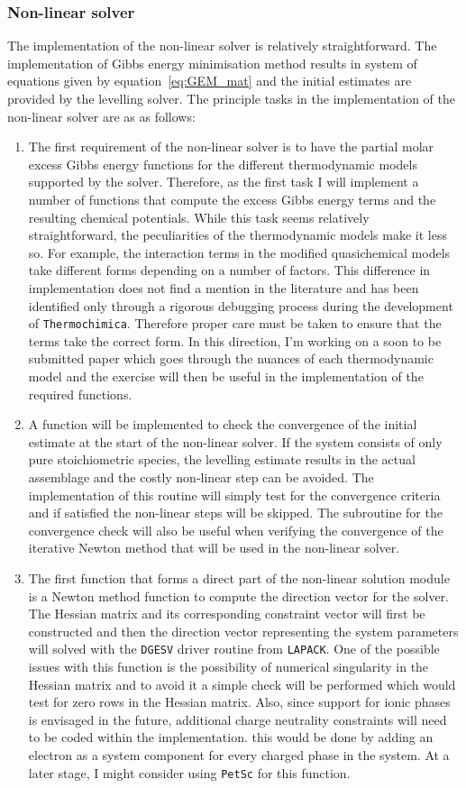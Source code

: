 	\subsubsection{Non-linear solver}
		The implementation of the non-linear solver is relatively straightforward. The implementation of Gibbs energy minimisation method results in system of equations given by equation~\eqref{eq:GEM_mat} and the initial estimates are provided by the levelling solver. The principle tasks in the implementation of the non-linear solver are as as follows:
		\begin{enumerate}
			\item The first requirement of the non-linear solver is to have the partial molar excess Gibbs energy functions for the different thermodynamic  models supported by the solver. Therefore, as the first task I will implement a number of functions that compute the excess Gibbs energy terms and the resulting chemical potentials. While this task seems relatively straightforward, the peculiarities of the thermodynamic models make it less so. For example, the interaction terms in the modified quasichemical models take different forms depending on a number of factors. This difference in implementation does not find a mention in the literature and has been identified only through a rigorous debugging process during the development of \texttt{Thermochimica}. Therefore proper care must be taken to ensure that the terms take the correct form. In this direction, I'm working on a soon to be submitted paper which goes through the nuances of each thermodynamic model and the exercise will then be useful in the implementation of the required functions.
			\item	A function will be implemented to check the convergence of the initial estimate at the start of the non-linear solver. If the system consists of only pure stoichiometric species, the levelling estimate results in the actual assemblage and the costly non-linear step can be avoided. The implementation of this routine will simply test for the convergence criteria and if satisfied the non-linear steps will be skipped. The subroutine for the convergence check will also be useful when verifying the convergence of the iterative Newton method that will be used in the non-linear solver.
			\item The first function that forms a direct part of the non-linear solution module is a Newton method function to compute the direction vector for the solver. The Hessian matrix and its corresponding constraint vector will first be constructed and then the direction vector representing the system parameters will solved with the \texttt{DGESV} driver routine from \texttt{LAPACK}.  One of the possible issues with this function is the possibility of numerical singularity in the Hessian matrix and to avoid it a simple check will be performed which would test for zero rows in the Hessian matrix. Also, since support for ionic phases is envisaged in the future, additional charge neutrality constraints will need to be coded within the implementation. this would be done by adding an electron as a system component for every charged phase in the system. At a later stage, I might consider using \texttt{PetSc} for this function.

\end{enumerate}
